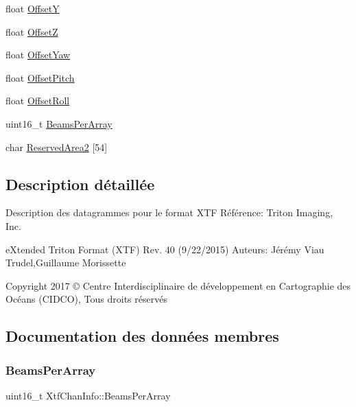 \begin{DoxyCompactItemize}
\item 
float \hyperlink{structXtfChanInfo_ab402aa93a4f7e970bb86ea7bc3077a8f}{OffsetY}
\item 
float \hyperlink{structXtfChanInfo_adf025ca392e5a738f0fbaeed19c5d5a9}{OffsetZ}
\item 
float \hyperlink{structXtfChanInfo_a1afc35991df2ca8fc588b75591fb8ba4}{Offset\+Yaw}
\item 
float \hyperlink{structXtfChanInfo_a60971c46937975d659f86539f21a1da5}{Offset\+Pitch}
\item 
float \hyperlink{structXtfChanInfo_afab796ec26755e5a2d4f0172886e38be}{Offset\+Roll}
\item 
uint16\+\_\+t \hyperlink{structXtfChanInfo_a63dafece54dc5dbc76298e86472902a7}{Beams\+Per\+Array}
\item 
char \hyperlink{structXtfChanInfo_a5cc2ab244998f4ff00c27ff54f4b86ae}{Reserved\+Area2} \mbox{[}54\mbox{]}
\end{DoxyCompactItemize}


\subsection{Description détaillée}
Description des datagrammes pour le format X\+TF Référence\+: Triton Imaging, Inc. 

e\+Xtended Triton Format (X\+TF) Rev. 40 (9/22/2015) Auteurs\+: Jérémy Viau Trudel,Guillaume Morissette

Copyright 2017 © Centre Interdisciplinaire de développement en Cartographie des Océans (C\+I\+D\+CO), Tous droits réservés 

\subsection{Documentation des données membres}
\mbox{\label{structXtfChanInfo_a63dafece54dc5dbc76298e86472902a7}} 
\subsubsection{\texorpdfstring{Beams\+Per\+Array}{BeamsPerArray}}
{\footnotesize\ttfamily uint16\+\_\+t Xtf\+Chan\+Info\+::\+Beams\+Per\+Array}

\mbox{\label{structXtfChanInfo_a9354d8fb4f2e0e24133e42779d9af1cc}} 
